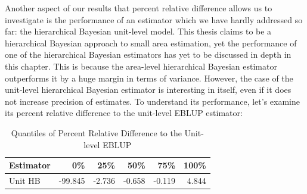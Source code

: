 \documentclass[12pt,twoside]{reedthesis}
\begin{document}
Another aspect of our results that percent relative difference allows us to investigate is the performance of an estimator which we have hardly addressed so far: the hierarchical Bayesian unit-level model. This thesis claims to be a hierarchical Bayesian approach to small area estimation, yet the performance of one of the hierarchical Bayesian estimators has yet to be discussed in depth in this chapter. This is because the area-level hierarchical Bayesian estimator outperforms it by a huge margin in terms of variance. However, the case of the unit-level hierarchical Bayesian estimator is interesting in itself, even if it does not increase precision of estimates. To understand its performance, let's examine its percent relative difference to the unit-level EBLUP estimator:
\begin{longtable}[t]{lrrrrr}
\caption{\label{tab:prd-unit}Quantiles of Percent Relative Difference to the Unit-level EBLUP}\\
\toprule
Estimator & 0\% & 25\% & 50\% & 75\% & 100\%\\
\midrule
Unit HB & -99.845 & -2.736 & -0.658 & -0.119 & 4.844\\
\bottomrule
\end{longtable}
\clearpage
\end{document}

